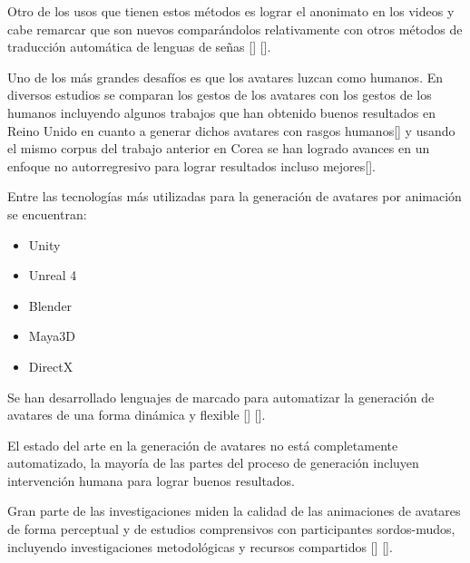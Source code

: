 Otro de los usos que tienen estos métodos es lograr el anonimato en los videos y cabe remarcar que  son nuevos comparándolos relativamente con otros métodos de traducción automática de lenguas de señas [\cite{kang2010effect}] [\cite{saragih2011real}].

Uno de los más grandes desafíos es que los avatares luzcan como humanos. En diversos estudios se comparan los gestos de los avatares con los gestos de los
humanos incluyendo algunos trabajos que han obtenido buenos resultados en Reino Unido en cuanto a generar dichos avatares con rasgos humanos[\cite{stoll2018sign}] y usando el mismo corpus del trabajo anterior en Corea se han logrado avances en un enfoque no autorregresivo para lograr resultados incluso mejores[\cite{hwang2021non}].

 Entre las tecnologías más utilizadas para la generación de avatares por animación se encuentran:
 \begin{itemize}
 \item  Unity
 \item Unreal 4
 \item Blender
 \item Maya3D 
 \item DirectX
 \end{itemize}  
 
 Se han desarrollado lenguajes de marcado para automatizar la generación de avatares de una forma dinámica y flexible [\cite{latoschik2017effect}] [\cite{aneja2019high}].

El estado del arte en la generación de avatares no está completamente automatizado, la mayoría de las partes del proceso de generación incluyen intervención humana
para lograr buenos resultados.

Gran parte de las investigaciones miden la calidad de las animaciones de avatares de forma perceptual y de estudios comprensivos con participantes sordos-mudos, incluyendo investigaciones metodológicas y recursos compartidos [\cite{huenerfauth2006generating}] [\cite{kacorri2017regression}].


